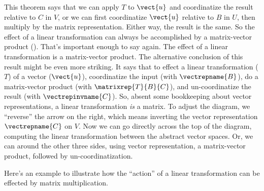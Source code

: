 %
This theorem says that we can apply $T$ to $\vect{u}$ and coordinatize the result relative to $C$ in $V$, or we can first coordinatize $\vect{u}$ relative to $B$ in $U$, then multiply by the matrix representation.  Either way, the result is the same.  So the effect of a linear transformation can always be accomplished by a matrix-vector product ().  That's important enough to say again.  The effect of a linear transformation is a matrix-vector product.
%
%
The alternative conclusion of this result might be even more striking.  It says that to effect a linear transformation ($T$) of a vector ($\vect{u}$), coordinatize the input (with $\vectrepname{B}$), do a matrix-vector product (with $\matrixrep{T}{B}{C}$), and un-coordinatize the result (with $\vectrepinvname{C}$).  So, absent some bookkeeping about vector representations, a linear transformation {\em is} a matrix.  To adjust the diagram, we ``reverse'' the arrow on the right, which means inverting the vector representation $\vectrepname{C}$ on $V$.  Now we can go directly across the top of the diagram, computing the linear transformation between the abstract vector spaces.  Or, we can around the other three sides, using vector representation, a matrix-vector product, followed by un-coordinatization.
%
%
\par
%
Here's an example to illustrate how the ``action'' of a linear transformation can be effected by matrix multiplication.
%
